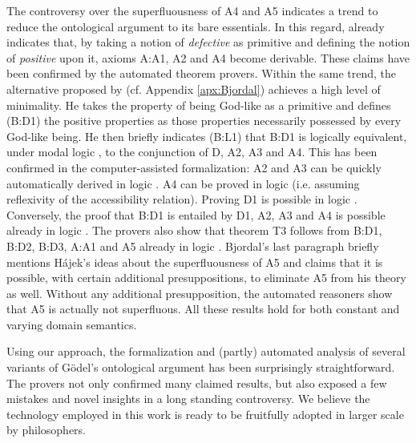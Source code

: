 \documentclass{birkjour}
\theoremstyle{definition}
\theoremstyle{remark}
\numberwithin{equation}{section}
\begin{document}
The controversy over the superfluousness of A4 and A5 indicates a trend to reduce the ontological argument to its bare essentials. In this regard, 
already \citet[p.~7]{anderson90:_some_emend_of_goedel_ontol_proof} indicates that, by taking a notion of \emph{defective} as primitive and defining the notion of \emph{positive} upon it, axioms A:A1, A2 and A4 become derivable. These claims have been confirmed by the automated theorem provers. Within the same trend, the alternative proposed by \citet{bjordal99} (cf. Appendix \ref{apx:Bjordal}) achieves a high level of minimality. He takes the property of being God-like as a primitive and defines (B:D1) the positive properties as those properties necessarily possessed by every God-like being. He then briefly indicates (B:L1) that B:D1 is logically equivalent, under modal logic \SFour, to the conjunction of D, A2, A3 and A4. This has been confirmed in the computer-assisted formalization: A2 and A3 can be quickly automatically derived in logic \K. A4 can be proved in logic \KT (i.e. assuming reflexivity of the accessibility relation). Proving D1 is possible in logic \KFour. Conversely, the proof that B:D1 is entailed by D1, A2, A3 and A4 is possible already in logic \K. The provers also show that theorem T3 follows from B:D1, B:D2, B:D3, A:A1 and A5 already in logic \KB. Bjordal's last paragraph briefly mentions Hájek's ideas about the superfluousness of A5 and claims that it is possible, with certain additional presuppositions, to eliminate A5 from his theory as well. Without any additional presupposition, the automated reasoners show that A5 is actually not superfluous. All these results hold for both constant and varying domain semantics.

Using our approach, the formalization and (partly) automated
analysis of several variants of G\"odel's ontological argument has been surprisingly
straightforward. The provers not only confirmed many claimed results, but also exposed a few mistakes and novel insights in a long standing controversy. 
We believe the technology employed in this work is ready to be 
fruitfully adopted in larger scale by philosophers.

\end{document}
